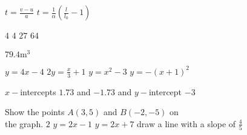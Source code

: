 \begin{Answer}[ref={ex12}]%
	\Question %
\begin{tasks}
	\task 	 $t =\frac{v -u}{a}$ 
	\task    $t =\frac{1}{\alpha } \left (\frac{l}{l_{0}} -1\right )$
\end{tasks}

\Question %
\begin{tasks}
	\task 	 $4$
	\task    $4$	
	\task 	 $27$
	\task    $64$
\end{tasks}

\Question $79.4 \mathrm{m}^{3}$

\Question %
\begin{tasks}
	\task 	 $y=4x-4$
	\task    $2y=\frac{x}{3}+1$	
	\task 	 $y =x^{2} -3$ 
	\task    $y =-(x+1)^{2}$ 
\end{tasks}

\Question %
$x-$intercepts $1.73$ and $ -1.73$ and $y-$intercept $ -3$

\Question %
\begin{tasks}
\task 	 Show the points $A \left (3 ,5\right )$ and $B \left ( -2 , -5\right )$ on\\ the graph.%
\task    $2$	
\task 	$y =2 x -1$ 
\task  $y =2 x +7$
\task  draw a line with a slope of $\frac{4}{5}$
\end{tasks}


\end{Answer}
